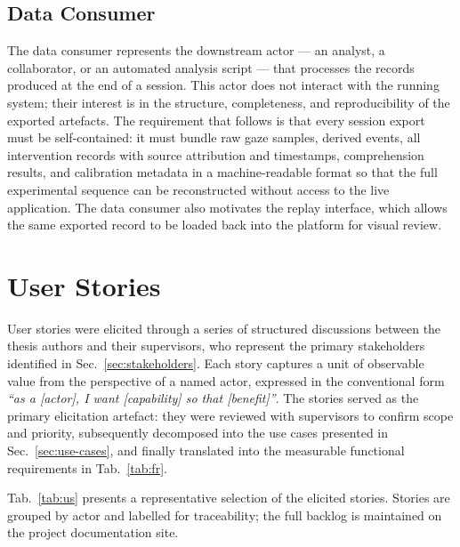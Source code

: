 \subsection{Data Consumer}
\label{sec:stakeholder-consumer}

The data consumer represents the downstream actor --- an analyst, a collaborator, or an automated analysis script --- that processes the records produced at the end of a session.
This actor does not interact with the running system; their interest is in the structure, completeness, and reproducibility of the exported artefacts.
The requirement that follows is that every session export must be self-contained: it must bundle raw gaze samples, derived events, all intervention records with source attribution and timestamps, comprehension results, and calibration metadata in a machine-readable format so that the full experimental sequence can be reconstructed without access to the live application.
The data consumer also motivates the replay interface, which allows the same exported record to be loaded back into the platform for visual review.

\section{User Stories}
\label{sec:user-stories}

User stories were elicited through a series of structured discussions between the thesis authors and their supervisors, who represent the primary stakeholders identified in Sec.~\ref{sec:stakeholders}.
Each story captures a unit of observable value from the perspective of a named actor, expressed in the conventional form \textit{``as a [actor], I want [capability] so that [benefit]''}.
The stories served as the primary elicitation artefact: they were reviewed with supervisors to confirm scope and priority, subsequently decomposed into the use cases presented in Sec.~\ref{sec:use-cases}, and finally translated into the measurable functional requirements in Tab.~\ref{tab:fr}.

Tab.~\ref{tab:us} presents a representative selection of the elicited stories.
Stories are grouped by actor and labelled for traceability; the full backlog is maintained on the project documentation site.

